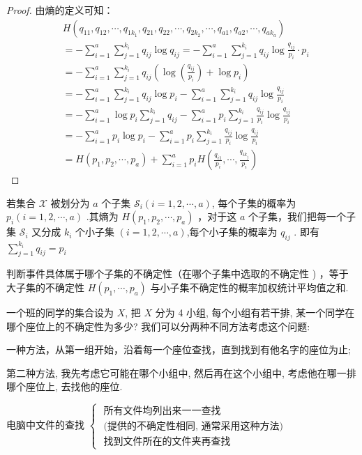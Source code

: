 \begin{proof}
 由熵的定义可知：
$$
\begin{aligned}
&H\left(q_{11}, q_{12}, \cdots, q_{1 k_{1}}, q_{21}, q_{22}, \cdots, q_{2 k_{2}}, \cdots, q_{a 1}, q_{a 2}, \cdots, q_{a k_{a}}\right) \\
&=-\sum_{i=1}^{a} \sum_{j=1}^{k_{i}} q_{i j} \log q_{i j}=-\sum_{i=1}^{a} \sum_{j=1}^{k_{i}} q_{i j} \log \frac{q_{i j}}{p_{i}} \cdot p_{i} \\
&=-\sum_{i=1}^{a} \sum_{j=1}^{k_{i}} q_{i j}\left(\log \left(\frac{q_{i j}}{p_{i}}\right)+\log p_{i}\right) \\
&=-\sum_{i=1}^{a} \sum_{j=1}^{k_{i}} q_{i j} \log p_{i}-\sum_{i=1}^{a} \sum_{j=1}^{k_{i}} q_{i j} \log \frac{q_{i j}}{p_{i}}\\
&=-\sum_{i=1}^{a} \log p_{i} \sum_{j=1}^{k_{i}} q_{i j}-\sum_{i=1}^{a} p_{i} \sum_{j=1}^{k_{i}} \frac{q_{i j}}{p_{i}} \log \frac{q_{i j}}{p_{i}} \\
&=-\sum_{i=1}^{a} p_{i} \log p_{i}-\sum_{i=1}^{a} p_{i} \sum_{j=1}^{k_{i}} \frac{q_{i j}}{p_{i}} \log \frac{q_{i j}}{p_{i}} \\
&=H\left(p_{1}, p_{2}, \cdots, p_{a}\right)+\sum_{i=1}^{a} p_{i} H\left(\frac{q_{i 1}}{p_{i}}, \cdots, \frac{q_{i k_{j}}}{p_{i}}\right)
\end{aligned}
$$
\end{proof}
\begin{remark}
若集合 $ \mathscr{X} $ 被划分为 $ a $ 个子集 $ \mathscr{S}_{i}(i=1,2, \cdots, a) $, 每个子集的概率为 $ p_{i}(i=1,2, \cdots, a) $ .其熵为 $ H\left(p_{1}, p_{2}, \cdots, p_{a}\right) $ ，对于这 $ a $ 个子集，我们把每一个子集 $ \mathscr{S}_{i} $ 又分成 $ k_{i} $ 个小子集 $ (i=1,2, \cdots, a) $,每个小子集的概率为 $ q_{i j} $ . 即有 $  \sum\limits_{j=1}^{k_{i}} q_{i j}=p_{i} $
\end{remark}
判断事件具体属于哪个子集的不确定性（在哪个子集中选取的不确定性 ) ，等于大子集的不确定性 $ H\left(p_{1}, \cdots, p_{a}\right) $ 与小子集不确定性的概率加权统计平均值之和.

\begin{example}
  一个班的同学的集合设为 $ X $, 把 $ X $ 分为 4 小组, 每个小组有若干排, 某一个同学在哪个座位上的不确定性为多少?
我们可以分两种不同方法考虑这个问题:

一种方法，从第一组开始，沿着每一个座位查找，直到找到有他名字的座位为止;

第二种方法, 我先考虑它可能在哪个小组中, 然后再在这个小组中, 考虑他在哪一排哪个座位上, 去找他的座位.
\end{example}
\begin{example}
电脑中文件的查找 $ \left\{\begin{array}{l}\text { 所有文件均列出来一一查找 } \\ \text { (提供的不确定性相同, 通常采用这种方法) } \\ \text { 找到文件所在的文件夹再查找 }\end{array}\right. $
\end{example}

